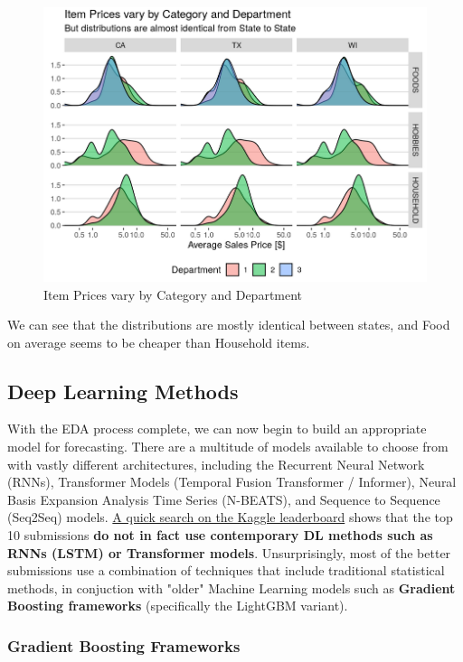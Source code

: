 \documentclass[12pt]{article}
\begin{document}
\begin{figure}[H]
    \centering
    \includegraphics[width=\textwidth]{Images/itempricescategory.png}
    \caption{Item Prices vary by Category and Department}
    \label{fig:6-itempricescategory}
\end{figure} 

\noindent We can see that the distributions are mostly identical between states, and Food on average seems to be cheaper than Household items. 

\subsection*{Deep Learning Methods}

With the EDA process complete, we can now begin to build an appropriate model for forecasting. There are a multitude of models available to choose from with vastly different architectures, including the Recurrent Neural Network (RNNs), Transformer Models (Temporal Fusion Transformer / Informer), Neural Basis Expansion Analysis Time Series (N-BEATS), and Sequence to Sequence (Seq2Seq) models. \href{https://www.kaggle.com/c/m5-forecasting-accuracy/leaderboard}{A quick search on the Kaggle leaderboard} shows that the top 10 submissions \textbf{do not in fact use contemporary DL methods such as RNNs (LSTM) or Transformer models}. Unsurprisingly, most of the better submissions use a combination of techniques that include traditional statistical methods, in conjuction with "older" Machine Learning models such as \textbf{Gradient Boosting frameworks} (specifically the LightGBM variant). 

\subsubsection*{Gradient Boosting Frameworks}
\end{document}
